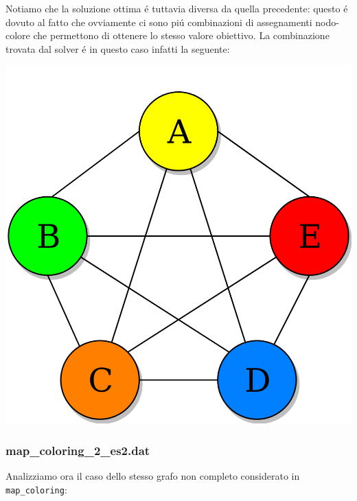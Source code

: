\documentclass{article}
\begin{document}
\pagebreak 

Notiamo che la soluzione ottima \'e tuttavia diversa da quella precedente: questo \'e dovuto al fatto che ovviamente ci sono pi\'u combinazioni di assegnamenti nodo-colore che permettono di ottenere lo stesso valore obiettivo. La combinazione trovata dal solver \'e in questo caso infatti la seguente:\\

\begin{center}
\includegraphics[scale=0.15]{complete_graph_coloured2.png}
\end{center}

\pagebreak

\subsubsection{map\_coloring\_2\_es2.dat}
Analizziamo ora il caso dello stesso grafo non completo considerato in \texttt{map\_coloring}:\\
\end{document}
